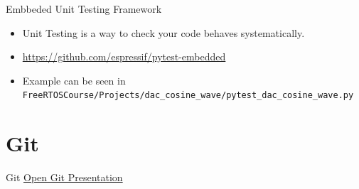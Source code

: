 \documentclass[10pt]{beamer}
\begin{document}
\begin{frame} {Embbeded Unit Testing Framework}
  \begin{itemize} 
    \item Unit Testing is a way to check your code behaves systematically.
      \item \url{https://github.com/espressif/pytest-embedded}
      \item Example can be seen in \texttt{FreeRTOSCourse/Projects/dac\_cosine\_wave/pytest\_dac\_cosine\_wave.py}
  \end{itemize}
\end{frame}

\section{Git}
\begin{frame}{Git}
  \href{run:git basics.pptx}{Open Git Presentation}
\end{frame}
\end{document}

